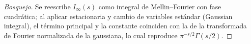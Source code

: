 \begin{proof}[Bosquejo]
Se reescribe $I_\infty(s)$ como integral de Mellin--Fourier con fase cuadrática; al
aplicar estacionaria y cambio de variables estándar (Gaussian integral), el término principal y la constante coinciden con la de la transformada de Fourier normalizada de la gaussiana, lo cual reproduce $\pi^{-s/2}\Gamma(s/2)$.
\end{proof}

